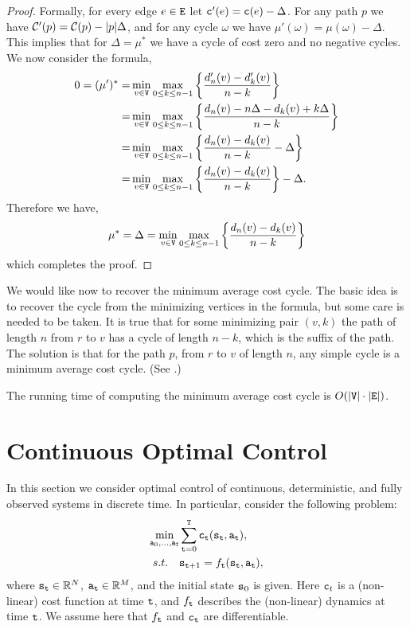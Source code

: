 \begin{proof}
Formally, for every edge $e\in {\tt E}$ let ${\tt c}'(e)={\tt c}(e)-\Delta$.
For any path $p$ we have $\mathcal{C}'(p)=\mathcal{C}(p)-|p|\Delta$, and for any
cycle $\omega$ we have $\mu'(\omega)=\mu(\omega)-\Delta$. This
implies that for $\Delta=\mu^*$ we have a cycle of cost zero and no
negative cycles. We now consider the formula,
\begin{align*}
0=(\mu')^*=&\min_{v\in {\tt V}} \max_{0\leq k\leq n-1}
\left\{\frac{d'_n(v)-d'_{k}(v)}{n-k}\right\}\\
=&\min_{v\in {\tt V}} \max_{0\leq k\leq n-1}
\left\{\frac{d_n(v)-n\Delta-d_{k}(v)+k\Delta}{n-k}\right\}\\
=&\min_{v\in {\tt V}} \max_{0\leq k\leq n-1}
\left\{\frac{d_n(v)-d_{k}(v)}{n-k}-\Delta\right\}\\
=&\min_{v\in {\tt V}} \max_{0\leq k\leq n-1}
\left\{\frac{d_n(v)-d_{k}(v)}{n-k}\right\}-\Delta.
\end{align*}
Therefore we have,
\[
\mu^*=\Delta=\min_{v\in {\tt V}} \max_{0\leq k\leq n-1}
\left\{\frac{d_n(v)-d_{k}(v)}{n-k}\right\}   
\]
which completes the proof.
\end{proof}

We would like now to recover the minimum average cost cycle. The
basic idea is to recover the cycle from the minimizing vertices in
the formula, but some care is needed to be taken. It is true that for some
minimizing pair $(v,k)$ the path of length $n$ from $r$ to $v$ has a
cycle of length $n-k$, which is the suffix of the path. The solution
is that for the path $p$, from $r$ to $v$ of length $n$, any simple
cycle is a minimum average cost cycle. (See \cite{ChaturvediM17}.)

The running time of computing the minimum average cost cycle is
$O(|{\tt V}|\cdot |{\tt E}|)$.



\section{Continuous Optimal Control
}\label{sec:continuous_control}
In this section we consider optimal control of continuous, deterministic, and fully observed systems in discrete time. 
In particular, consider the following problem:
\begin{equation}\label{eq:opt_control}
    \begin{split}
        \min_{{\tt a}_0,\dots,{\tt a}_{{\tt T}}} & \sum_{{\tt t}=0}^{\tt T} {\tt c}_{\tt t}({\tt s}_{\tt t}, {\tt a}_{\tt t}), \\
        s.t. \quad & {{\tt s}_{{\tt t} + 1}} = {f_{\tt t}}({{\tt s}_{\tt t}},{{\tt a}_{\tt t}}), 
    \end{split}
\end{equation}
where ${\tt s}_{\tt t} \in \mathbb{R}^N$, ${\tt a}_{\tt t} \in \mathbb{R}^M$, and the initial state ${\tt s}_0$ is given. Here ${\tt c}_t$ is a (non-linear) cost function at time ${\tt t}$, and $f_{\tt t}$ describes the (non-linear) dynamics  at time ${\tt t}$. We assume here that $f_{\tt t}$ and ${\tt c}_{\tt t}$ are differentiable.

